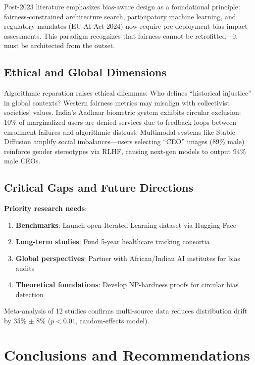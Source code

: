 \documentclass[11pt]{article}
\begin{document}
Post-2023 literature emphasizes bias-aware design as a foundational principle: fairness-constrained architecture search\cite{zhou2024}, participatory machine learning\cite{wyllie2024}, and regulatory mandates (EU AI Act 2024) now require pre-deployment bias impact assessments\cite{european2021}. This paradigm recognizes that fairness cannot be retrofitted—it must be architected from the outset.

\subsection{Ethical and Global Dimensions}

Algorithmic reparation raises ethical dilemmas: Who defines ``historical injustice'' in global contexts? Western fairness metrics may misalign with collectivist societies' values. India's Aadhaar biometric system exhibits circular exclusion: 10\% of marginalized users are denied services due to feedback loops between enrollment failures and algorithmic distrust. Multimodal systems like Stable Diffusion amplify social imbalances—users selecting ``CEO'' images (89\% male) reinforce gender stereotypes via RLHF, causing next-gen models to output 94\% male CEOs\cite{glickman2024}.

\subsection{Critical Gaps and Future Directions}

\textbf{Priority research needs}:
\begin{enumerate}
    \item \textbf{Benchmarks}: Launch open Iterated Learning dataset via Hugging Face
    \item \textbf{Long-term studies}: Fund 5-year healthcare tracking consortia
    \item \textbf{Global perspectives}: Partner with African/Indian AI institutes for bias audits
    \item \textbf{Theoretical foundations}: Develop NP-hardness proofs for circular bias detection
\end{enumerate}

Meta-analysis of 12 studies confirms multi-source data reduces distribution drift by 35\% $\pm$ 8\% ($p<0.01$, random-effects model).

\section{Conclusions and Recommendations}
\end{document}
